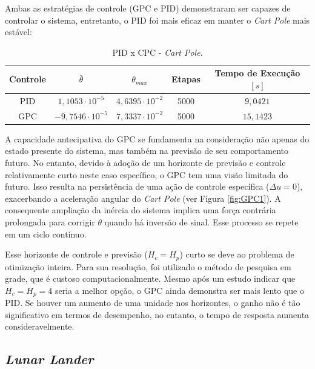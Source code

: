\documentclass[12pt,           %
a4paper,                       %
openany,                       %
oneside,                       %
chapter=TITLE,                 %
english,                       %
spanish,                       %
brazil,                        %
sumario=tradicional]{abntex2}  %
\begin{document}
\begin{OnehalfSpace}
Ambas as estratégias de controle (GPC e PID) demonstraram ser capazes de controlar o sistema, entretanto, o PID foi mais eficaz em manter o \textit{Cart Pole} mais estável:

\begin{table}[H]
	\centering
	\vspace*{-.2cm}
	\caption{PID x CPC - \textit{Cart Pole}.}
	\begin{tabular}{|c|c|c|c|c|}
            \hline
            Controle & $\bar{\theta}$ & $\theta_{max}$ & Etapas & Tempo de Execução $[s]$\\
            \hline
            PID & $1,1053\cdot 10^{-5}$ & $4,6395\cdot 10^{-2}$ & 5000 & $9,0421$\\
            \hline
            GPC & $-9,7546\cdot 10^{-5}$ & $7,3337\cdot 10^{-2}$  & 5000 & $15,1423$\\ 
            \hline
	\end{tabular}  
    \label{tab:intcartpole}                 %
\end{table}
\vspace*{-0.7cm}
{\raggedright {}}

A capacidade antecipativa do GPC se fundamenta na consideração não apenas do estado presente do sistema, mas também na previsão de seu comportamento futuro. No entanto, devido à adoção de um horizonte de previsão e controle relativamente curto neste caso específico, o GPC tem uma visão limitada do futuro. Isso resulta na persistência de uma ação de controle específica ($\Delta u = 0$), exacerbando a aceleração angular do \textit{Cart Pole} (ver Figura \ref{fig:GPC1}). A consequente ampliação da inércia do sistema implica uma força contrária prolongada para corrigir $\theta$ quando há inversão de sinal. Esse processo se repete em um ciclo contínuo. 

Esse horizonte de controle e previsão ($H_c=H_p$) curto se deve ao problema de otimização inteira. Para sua resolução, foi utilizado o método de pesquisa em grade, que é custoso computacionalmente. Mesmo após um estudo indicar que $H_c=H_p=4$ seria a melhor opção, o GPC ainda demonstra ser mais lento que o PID. Se houver um aumento de uma unidade nos horizontes, o ganho não é tão significativo em termos de desempenho, no entanto, o tempo de resposta aumenta consideravelmente.
 
\subsection{\textit{Lunar Lander}}


\end{OnehalfSpace}
\end{document}
